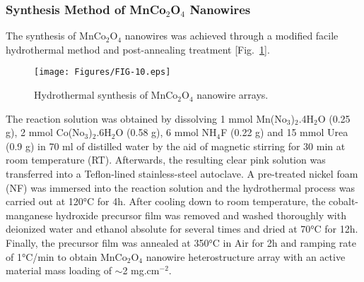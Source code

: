 \documentclass[reprint,amsmath,amssymb,aps,floatfix,
]{revtex4-2}
\begin{document}
\subsubsection{Synthesis Method of MnCo$_2$O$_4$ Nanowires}
The synthesis of MnCo$_2$O$_4$ nanowires was achieved through a modified facile hydrothermal method and post-annealing treatment [Fig.~\ref{fig:fig10}].
\begin{figure}[b]
    \centering
    \texttt{[image: Figures/FIG-10.eps]}
    \caption{\label{fig:fig10}Hydrothermal synthesis of MnCo$_2$O$_4$ nanowire arrays.}
    \end{figure}
The reaction solution was obtained by dissolving 1 mmol Mn(No$_3$)$_2$.4H$_2$O (0.25 g), 2 mmol Co(No$_3$)$_2$.6H$_2$O (0.58 g), 6 mmol NH$_4$F (0.22 g) and 15 mmol Urea (0.9 g) in 70 ml of distilled water by the aid of magnetic stirring for 30 min at room temperature (RT). Afterwards, the resulting clear pink solution was transferred into a Teflon-lined stainless-steel autoclave. A pre-treated nickel foam (NF) was immersed into the reaction solution and the hydrothermal process was carried out at \ang{120}C for 4h. After cooling down to room temperature, the cobalt-manganese hydroxide precursor film was removed and washed thoroughly with deionized water and ethanol absolute for several times and dried at \ang{70}C for 12h. Finally, the precursor film was annealed at \ang{350}C in Air for 2h and ramping rate of \ang{1}C/min to obtain MnCo$_2$O$_4$ nanowire heterostructure array with an active material mass loading of $\sim$2 mg.cm$^{-2}$.
\end{document}
